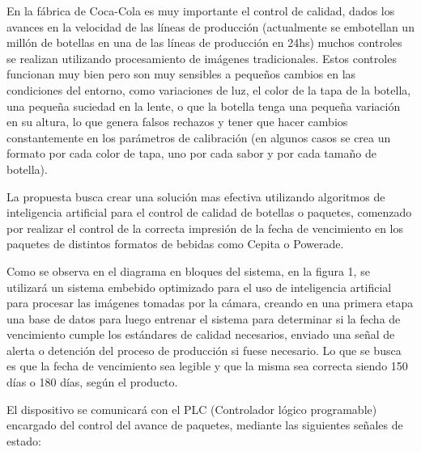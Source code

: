 \documentclass[11pt]{charter}
\begin{document}
En la fábrica de Coca-Cola es muy importante el control de calidad, dados los avances en la velocidad de las líneas de producción (actualmente se embotellan un millón de botellas en una de las líneas de producción en 24hs) muchos controles se realizan utilizando procesamiento de imágenes tradicionales.	Estos controles funcionan muy bien pero son muy sensibles a pequeños cambios en las condiciones del entorno, como variaciones de luz, el color de la tapa de la botella, una pequeña suciedad en la lente, o que la botella tenga una pequeña variación en su altura, lo que genera falsos rechazos y tener que hacer cambios constantemente en los parámetros de calibración (en algunos casos se crea un formato por cada color de tapa, uno por cada sabor y por cada tamaño de botella). 

La propuesta busca crear una solución mas efectiva utilizando algoritmos de inteligencia artificial para el control de calidad de botellas o paquetes, comenzado por realizar el control de la correcta impresión de la fecha de vencimiento en los paquetes de distintos formatos de bebidas como Cepita o Powerade.

Como se observa en el diagrama en bloques del sistema, en la figura 1, se utilizará un sistema embebido optimizado para el uso de inteligencia artificial para procesar las imágenes tomadas por la cámara, creando en una primera etapa una base de datos para luego entrenar el sistema para determinar si la fecha de vencimiento cumple los estándares de calidad necesarios, enviado una señal de alerta o detención del proceso de producción si fuese necesario. Lo que se busca es que la fecha de vencimiento sea legible y que la misma sea correcta siendo 150 días o 180 días, según el producto.



El dispositivo se comunicará con el PLC (Controlador lógico programable) encargado del control del avance de paquetes, mediante las siguientes señales de estado:
\end{document}
